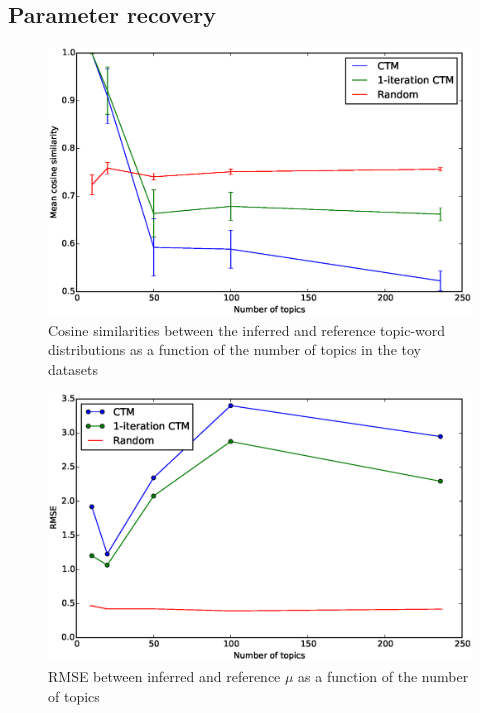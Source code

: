 \documentclass[12pt,a4paper,twoside,openright]{report}
\begin{document}
\subsection{Parameter recovery}

\begin{figure}[!htb]
\includegraphics[width=\textwidth]{sim-beta-cosine.eps}
\caption{Cosine similarities between the inferred and reference topic-word distributions as a function of the number of topics in the toy datasets}
\label{fig:sim-beta-cosine}
\end{figure}

\begin{figure}[!htb]
\includegraphics[width=\textwidth]{sim-mu-rmse.eps}
\caption{RMSE between inferred and reference $\mu$ as a function of the number of topics}
\label{fig:sim-mu-rmse}
\end{figure}
\end{document}
